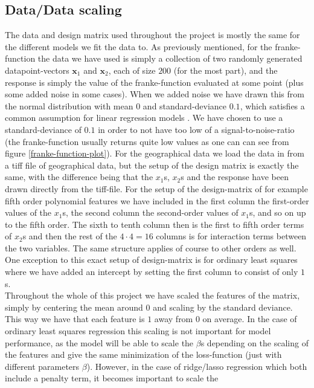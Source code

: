 \documentclass{article}
\begin{document}
\subsection{Data/Data scaling}
The data and design matrix used throughout the project is mostly the same for
the different models we fit the data to. As previously mentioned, for the
franke-function the data we have used is simply a collection of two randomly
generated datapoint-vectors $\mathbf{x}_1$ and $\mathbf{x}_2$, each of size
$200$ (for the most part), and the response is simply the value of the
franke-function evaluated at some point (plus some added noise in some cases).
When we added noise we have drawn this from the normal distribution with mean
$0$ and standard-deviance $0.1$, which satisfies a common assumption for linear
regression models \cite[s.~1.4.5]{murphy2012machine}. We have chosen to use a
standard-deviance of $0.1$ in order to not have too low of a
signal-to-noise-ratio (the franke-function usually returns quite low values as
one can can see from figure \ref{franke-function-plot}). For the geographical
data we load the data in from a tiff file of geographical data, but the setup of
the design matrix is exactly the same, with the difference being that the
$x_1$s, $x_2$s and the response have been drawn directly from the tiff-file.
For the setup of the design-matrix of for example fifth order polynomial features we have
included in the first column the first-order values of the $x_1$s, the second
column the second-order values of $x_1$s, and so on up to the fifth order.  The
sixth to tenth column then is the first to fifth order terms of $x_2$s and then
the rest of the $4 \cdot 4 = 16$ columns is for interaction terms between the
two variables. The same structure applies of course to other orders as well. One
exception to this exact setup of design-matrix is for ordinary least squares
where we have added an intercept by setting the first column to consist of only
$1$s.
\\
Throughout the whole of this project we have scaled the features of the matrix,
simply by centering the mean around $0$ and scaling by the standard deviance.
This way we have that each feature is $1$ away from $0$ on average. In the case
of ordinary least squares regression this scaling is not important for model
performance, as the model will be able to scale the $\beta$s depending on the
scaling of the features and give the same minimization of the loss-function
(just with different parameters $\beta$).  However, in the case of ridge/lasso
regression which both include a penalty term, it becomes important to scale the
\end{document}
